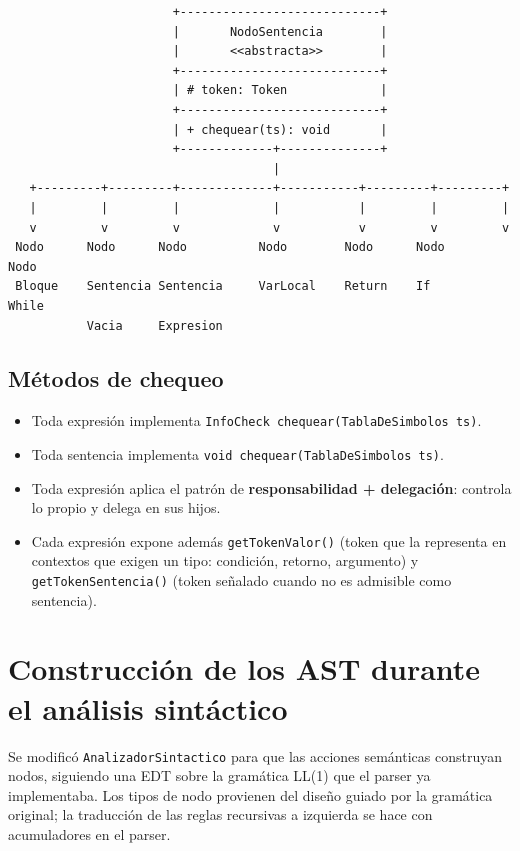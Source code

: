 \documentclass[11pt,a4paper]{article}
\begin{document}
{\begin{verbatim}
                       +----------------------------+
                       |       NodoSentencia        |
                       |       <<abstracta>>        |
                       +----------------------------+
                       | # token: Token             |
                       +----------------------------+
                       | + chequear(ts): void       |
                       +-------------+--------------+
                                     |
   +---------+---------+-------------+-----------+---------+---------+
   |         |         |             |           |         |         |
   v         v         v             v           v         v         v
 Nodo      Nodo      Nodo          Nodo        Nodo      Nodo      Nodo
 Bloque    Sentencia Sentencia     VarLocal    Return    If        While
           Vacia     Expresion
\end{verbatim}
}

\subsection{Métodos de chequeo}

\begin{itemize}
  \item Toda expresión implementa \texttt{InfoCheck chequear(TablaDeSimbolos ts)}.
  \item Toda sentencia implementa \texttt{void chequear(TablaDeSimbolos ts)}.
  \item Toda expresión aplica el patrón de \textbf{responsabilidad + delegación}:
        controla lo propio y delega en sus hijos.
  \item Cada expresión expone además \texttt{getTokenValor()} (token que la
        representa en contextos que exigen un tipo: condición, retorno, argumento)
        y \texttt{getTokenSentencia()} (token señalado cuando no es admisible como
        sentencia).
\end{itemize}

\section{Construcción de los AST durante el análisis sintáctico}

Se modificó \texttt{AnalizadorSintactico} para que las acciones semánticas
construyan nodos, siguiendo una EDT sobre la gramática LL(1) que el parser ya
implementaba. Los tipos de nodo provienen del diseño guiado por la gramática
original; la traducción de las reglas recursivas a izquierda se hace con
acumuladores en el parser.
\end{document}
